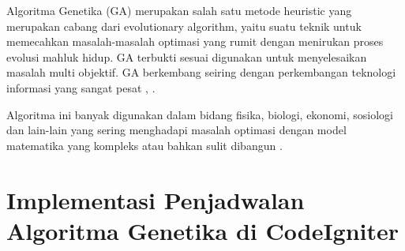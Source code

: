 Algoritma Genetika (GA) merupakan salah satu metode heuristic yang merupakan cabang dari evolutionary algorithm, yaitu suatu teknik untuk memecahkan masalah-masalah optimasi yang rumit dengan menirukan proses evolusi mahluk hidup. GA terbukti sesuai digunakan untuk menyelesaikan masalah multi objektif. GA berkembang seiring dengan perkembangan teknologi informasi yang sangat pesat \cite{liu2016mining}, \cite{wei2015genetic}.

Algoritma ini banyak digunakan dalam bidang fisika, biologi, ekonomi, sosiologi dan lain-lain yang sering menghadapi masalah optimasi dengan model matematika yang kompleks atau bahkan sulit dibangun \cite{liu2016mining}.

\section{Implementasi Penjadwalan Algoritma Genetika di CodeIgniter}
